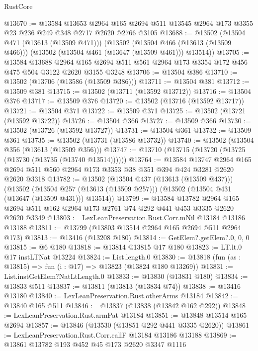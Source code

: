 \begin{lexlean}{RustCore}
\begin{coremodule}
@13670 := @13584
    @13653
    @2964
    @165
    @2694
    @511
    @13545
    @2964
    @173
    @3355
    @23
    @236
    @249
    @348
    @2717
    @2620
    @2766
    @3105
@13688 := @13502
    (@13504 @471 (@13613 (@13509 @471)))
    (@13502
      (@13504 @466 (@13613 (@13509 @466)))
      (@13502 (@13504 @461 (@13647 (@13509 @461))) @13514))
@13705 := @13584
    @13688
    @2964
    @165
    @2694
    @511
    @561
    @2964
    @173
    @3354
    @172
    @456
    @475
    @504
    @3122
    @2620
    @3155
    @3248
@13706 := @13504 @386
@13710 := @13502 (@13706 (@13586 (@13509 @386)))
@13711 := @13504 @381
@13712 := @13509 @381
@13715 := @13502 (@13711 (@13592 @13712))
@13716 := @13504 @376
@13717 := @13509 @376
@13720 := @13502 (@13716 (@13592 @13717))
@13721 := @13504 @371
@13722 := @13509 @371
@13725 := @13502 (@13721 (@13592 @13722))
@13726 := @13504 @366
@13727 := @13509 @366
@13730 := @13502 (@13726 (@13592 @13727))
@13731 := @13504 @361
@13732 := @13509 @361
@13735 := @13502 (@13731 (@13586 @13732))
@13740 := @13502 (@13504 @356 (@13613 (@13509 @356)))
@13747 := @13710 (@13715 (@13720 (@13725 (@13730 (@13735 (@13740 @13514))))))
@13764 := @13584
    @13747
    @2964
    @165
    @2694
    @511
    @560
    @2964
    @173
    @3353
    @38
    @351
    @394
    @424
    @3281
    @2620
    @2620
    @3318
@13782 := @13502
    (@13504 @437 (@13613 (@13509 @437)))
    (@13502
      (@13504 @257 (@13613 (@13509 @257)))
      (@13502 (@13504 @431 (@13647 (@13509 @431))) @13514))
@13799 := @13584
    @13782
    @2964
    @165
    @2694
    @511
    @162
    @2964
    @173
    @2761
    @74
    @292
    @441
    @453
    @3335
    @2620
    @2620
    @3349
@13803 := LexLeanPreservation.Rust.Corr.mNil @13184 @13186 @13188
@13811 := @13799 (@13803 @13514 @2964 @165 @2694 @511 @2964 @173)
@13813 := @13416 (@13208 @180)
@13814 := GetElem?.getElem?.{0, 0, 0}
@13815 := @6 @180
@13818 := @13814 @13815 @17 @180
@13823 := LT.lt.{0} @17 instLTNat @13224
@13824 := List.length.{0}
@13830 := @13818 (fun (as : @13815) => fun (i : @17) => @13823 (@13824 @180 @13269))
@13831 := List.instGetElem?NatLtLength.{0}
@13833 := @13830 (@13831 @180)
@13834 := @13833 @511
@13837 := @13811 (@13813 (@13834 @74))
@13838 := @13416 @13180
@13840 := LexLeanPreservation.Rust.otherArms @13184
@13842 := @13840 @165 @511
@13846 := @13837 (@13838 (@13842 @162 @292))
@13848 := LexLeanPreservation.Rust.armPat @13184
@13851 := @13848 @13514 @165 @2694
@13857 := @13846 (@13530 (@13851 @292 @441 @3335 @2620))
@13861 := LexLeanPreservation.Rust.Corr.callF @13184 @13186 @13188
@13869 := @13861 @13782 @193 @452 @45 @173 @2620 @3347 @1116

\end{coremodule}
\end{lexlean}
